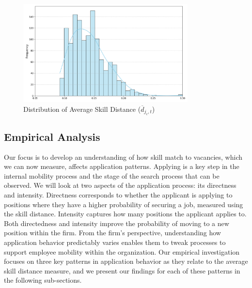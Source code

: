 \begin{figure}[h]
    \begin{center}
        \begin{minipage}{\textwidth}
            \centering
            \includegraphics[width=0.8\textwidth,height=0.4\textheight]{new_img/histogram_prosp.png}
            \caption{Distribution of Average Skill Distance (\(\overline{d}_{j_c, t}\))}
            \label{fig:s_dist_hist}
        \end{minipage}
    \end{center}
\end{figure}




\subsection{Empirical Analysis}

Our focus is to develop an understanding of how skill match to vacancies, which we can now measure, affects application 
patterns. Applying is a key step in the internal mobility process and the stage of the search process that can be observed. 
We will look at two aspects of the application process: its directness and intensity. Directness corresponds to whether 
the applicant is applying to positions where they have a higher probability of securing a job, measured using the skill 
distance. Intensity captures how many positions the applicant applies to. Both directedness and intensity improve the 
probability of moving to a new position within the firm. From the firm's perspective, understanding how application 
behavior predictably varies enables them to tweak processes to support employee mobility within the organization. Our 
empirical investigation focuses on three key patterns in application behavior as they relate to the average skill distance 
measure, and we present our findings for each of these patterns in the following sub-sections.


